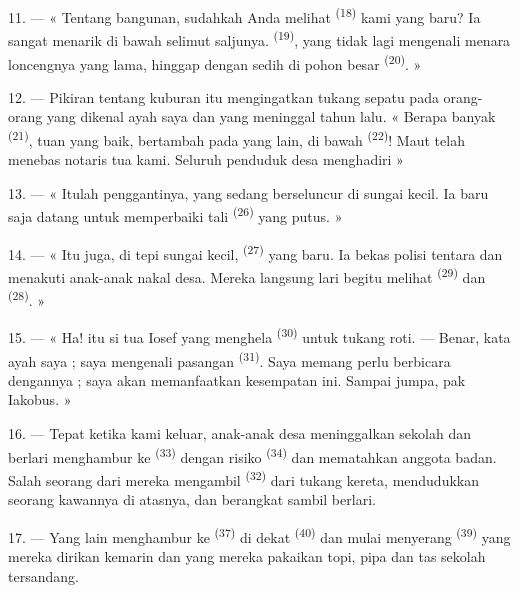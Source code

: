11. --- « Tentang bangunan, sudahkah Anda melihat 
\textsuperscript{(18)} kami yang baru? Ia sangat menarik di bawah
selimut saljunya.  \textsuperscript{(19)},
yang tidak lagi mengenali menara loncengnya yang lama, hinggap dengan
sedih di pohon besar  \textsuperscript{(20)}. »

12. --- Pikiran tentang kuburan itu mengingatkan tukang sepatu pada
orang-orang yang dikenal ayah saya dan yang meninggal tahun lalu. «
Berapa banyak  \textsuperscript{(21)}, tuan yang baik,
bertambah pada yang lain, di bawah 
\textsuperscript{(22)}! Maut telah menebas notaris tua kami. Seluruh
penduduk desa menghadiri  »

13. --- « Itulah penggantinya, yang sedang berseluncur di sungai
kecil. Ia baru saja datang untuk memperbaiki tali  \textsuperscript{(26)} yang putus. »

14. --- « Itu juga, di tepi sungai kecil, 
\textsuperscript{(27)} yang baru. Ia bekas polisi tentara dan menakuti
anak-anak nakal desa. Mereka langsung lari begitu melihat
 \textsuperscript{(29)} dan  \textsuperscript{(28)}. »

15. --- « Ha! itu si tua Iosef yang menghela  \textsuperscript{(30)} untuk tukang roti. ---
Benar, kata ayah saya ; saya mengenali pasangan 
\textsuperscript{(31)}. Saya memang perlu berbicara dengannya ; saya
akan memanfaatkan kesempatan ini. Sampai jumpa, pak Iakobus. »

16. --- Tepat ketika kami keluar, anak-anak desa meninggalkan sekolah
dan berlari menghambur ke  \textsuperscript{(33)}
dengan risiko  \textsuperscript{(34)} dan mematahkan
anggota badan. Salah seorang dari mereka mengambil  \textsuperscript{(32)} dari tukang kereta, mendudukkan
seorang kawannya di atasnya, dan berangkat sambil berlari.

17. --- Yang lain menghambur ke 
\textsuperscript{(37)} di dekat  \textsuperscript{(40)}
dan mulai menyerang  \textsuperscript{(39)} yang
mereka dirikan kemarin dan yang mereka pakaikan topi, pipa dan tas
sekolah tersandang.

